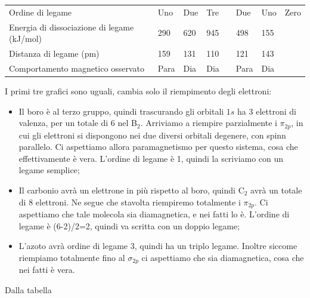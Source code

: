 \begin{center}
\begin{tabular}{ m{3.2cm}m{1cm}m{1cm}m{1cm}|m{1cm}m{1cm}m{1cm}m{1cm}}
    \vspace{0.4cm}Ordine di legame & Uno & Due & Tre & & Due & Uno & Zero\\
    \vspace{0.2cm}Energia di dissociazione di legame (kJ/mol) & 290 & 620 &945 & & 498 & 155\\
    \vspace{0.2cm}Distanza di legame (pm) & 159 & 131 & 110 & & 121 & 143\\
    \vspace{0.2cm}Comportamento magnetico osservato & Para & Dia & Dia & & Para & Dia
\end{tabular}
\end{center}
I primi tre grafici sono uguali, cambia solo il riempimento degli elettroni:
\begin{itemize}
    \item Il boro è al terzo gruppo, quindi trascurando gli orbitali $1s$ ha 3 elettroni di valenza, per un totale di 6 nel B$_2$.
    Arriviamo a riempire parzialmente i $\pi_{2p}$, in cui gli elettroni si dispongono nei due diversi orbitali degenere, con spinn parallelo. Ci aspettiamo allora paramagnetismo per questo sistema, cosa che effettivamente è vera. L'ordine di legame è 1, quindi la scriviamo con un legame semplice;
    \item Il carbonio avrà un elettrone in più rispetto al boro, quindi C$_2$ avrà un totale di 8 elettroni. Ne segue che stavolta riempiremo totalmente i $\pi_{2p}$. Ci aspettiamo che tale molecola sia diamagnetica, e nei fatti lo è. L'ordine di legame è (6-2)/2=2, quindi va scritta con un doppio legame;
    \item L'azoto avrà ordine di legame 3, quindi ha un triplo legame. Inoltre siccome riempiamo totalmente fino al $\sigma_{2p}$ ci aspettiamo che sia diamagnetica, cosa che nei fatti è vera.
\end{itemize}
Dalla tabella 
